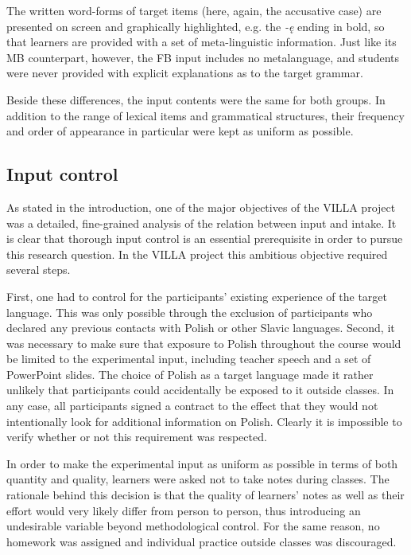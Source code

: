 The written word-forms of target items (here, again, the accusative case) are presented on screen and graphically highlighted, e.g. the \textit{-ę} ending in bold, so that learners are provided with a set of meta-linguistic information. Just like its MB counterpart, however, the FB input includes no metalanguage, and students were never provided with explicit explanations as to the target grammar. 

Beside these differences, the input contents were the same for both groups. In addition to the range of lexical items and grammatical structures, their frequency and order of appearance in particular were kept as uniform as possible. 

\subsection{Input control}\label{sec:02:1.1}

As stated in the introduction, one of the major objectives of the VILLA project was a detailed, fine-grained analysis of the relation between input and intake. It is clear that thorough input control is an essential prerequisite in order to pursue this research question. In the VILLA project this ambitious objective required several steps.

First, one had to control for the participants’ existing experience of the target language. This was  only possible through the exclusion of participants who declared any previous contacts with Polish or other Slavic languages. Second, it was necessary to make sure that exposure to Polish throughout the course would be limited to the experimental input, including teacher speech and a set of PowerPoint slides. The choice of Polish as a target language made it rather unlikely that participants could accidentally be exposed to it outside classes. In any case, all participants signed a contract to the effect that they would not intentionally look for additional information on Polish. Clearly it is impossible to verify whether or not this requirement was respected.

In order to make the experimental input as uniform as possible in terms of both quantity and quality, learners were asked not to take notes during classes. The rationale behind this decision is that the quality of learners’ notes as well as their effort would very likely differ from person to person, thus introducing an undesirable variable beyond methodological control. For the same reason, no homework was assigned and individual practice outside classes was discouraged.

